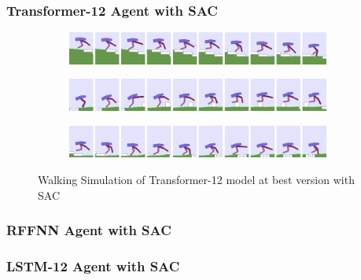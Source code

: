 \documentclass{beamer}
\begin{document}
\begin{frame}
\frametitle{Transformer-12 Agent with SAC}
\begin{figure}[!ht]
	\centering
	\begin{subfigure}{.95\textwidth}
		\centering
		\includegraphics[width=0.95\textwidth]{figures/bipedal/anim/trsf-12-stairs.png}
		\label{fig:anim_trsf_stairs}
	\end{subfigure}
	\begin{subfigure}{.95\textwidth}
		\centering
		\includegraphics[width=0.95\textwidth]{figures/bipedal/anim/trsf-12-hurdle.png}
		\label{fig:anim_trsf_hurdle}
	\end{subfigure}
	\begin{subfigure}{.95\textwidth}
		\centering
		\includegraphics[width=0.95\textwidth]{figures/bipedal/anim/trsf-12-pitfall.png}
		\label{fig:anim_trsf_pitfall}
	\end{subfigure}
	\caption{Walking Simulation of Transformer-12 model at best version with SAC}
	\label{fig:trsf_simulation}
\end{figure}
\end{frame}

\begin{frame}
\frametitle{RFFNN Agent with SAC}
\begin{center}
\end{center} 
\end{frame}

\begin{frame}
\frametitle{LSTM-12 Agent with SAC}
\begin{center}
\end{center} 
\end{frame}
\end{document}
